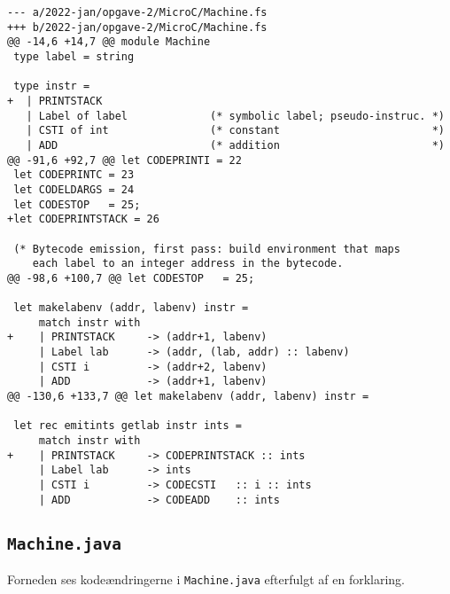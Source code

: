 \begin{verbatim}
--- a/2022-jan/opgave-2/MicroC/Machine.fs
+++ b/2022-jan/opgave-2/MicroC/Machine.fs
@@ -14,6 +14,7 @@ module Machine
 type label = string
 
 type instr =
+  | PRINTSTACK
   | Label of label             (* symbolic label; pseudo-instruc. *)
   | CSTI of int                (* constant                        *)
   | ADD                        (* addition                        *)
@@ -91,6 +92,7 @@ let CODEPRINTI = 22
 let CODEPRINTC = 23
 let CODELDARGS = 24
 let CODESTOP   = 25;
+let CODEPRINTSTACK = 26
 
 (* Bytecode emission, first pass: build environment that maps 
    each label to an integer address in the bytecode.
@@ -98,6 +100,7 @@ let CODESTOP   = 25;
 
 let makelabenv (addr, labenv) instr = 
     match instr with
+    | PRINTSTACK     -> (addr+1, labenv)
     | Label lab      -> (addr, (lab, addr) :: labenv)
     | CSTI i         -> (addr+2, labenv)
     | ADD            -> (addr+1, labenv)
@@ -130,6 +133,7 @@ let makelabenv (addr, labenv) instr =
 
 let rec emitints getlab instr ints = 
     match instr with
+    | PRINTSTACK     -> CODEPRINTSTACK :: ints
     | Label lab      -> ints
     | CSTI i         -> CODECSTI   :: i :: ints
     | ADD            -> CODEADD    :: ints
\end{verbatim}

\subsection{\texttt{Machine.java}}

Forneden ses kodeændringerne i \texttt{Machine.java} efterfulgt af en forklaring.

